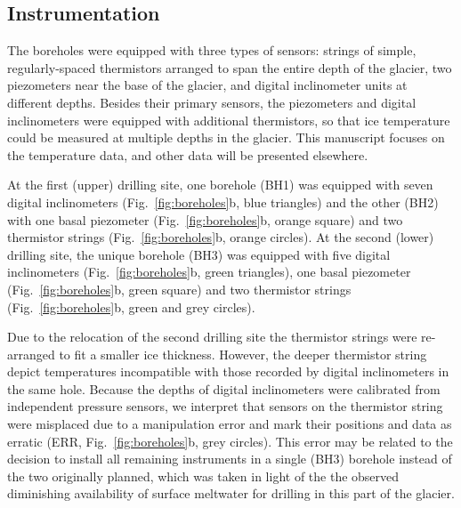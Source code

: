 \documentclass[utf8]{article}
\begin{document}
\subsection{Instrumentation}

    The boreholes were equipped with three types of sensors: strings of simple,
    regularly-spaced thermistors arranged to span the entire depth of the
    glacier, two piezometers near the base of the glacier, and digital
    inclinometer units at different depths. Besides their primary sensors, the
    piezometers and digital inclinometers were equipped with additional
    thermistors, so that ice temperature could be measured at multiple depths
    in the glacier. This manuscript focuses on the temperature data, and other
    data will be presented elsewhere.

    At the first (upper) drilling site, one borehole (BH1) was equipped with
    seven digital inclinometers (Fig.~\ref{fig:boreholes}b, blue triangles) and
    the other (BH2) with one basal piezometer (Fig.~\ref{fig:boreholes}b,
    orange square) and two thermistor strings (Fig.~\ref{fig:boreholes}b,
    orange circles). At the second (lower) drilling site, the unique
    borehole (BH3) was equipped with five digital inclinometers
    (Fig.~\ref{fig:boreholes}b, green triangles), one basal piezometer
    (Fig.~\ref{fig:boreholes}b, green square) and two thermistor strings
    (Fig.~\ref{fig:boreholes}b, green and grey circles).

    Due to the relocation of the second drilling site the thermistor strings
    were re-arranged to fit a smaller ice thickness. However, the deeper
    thermistor string depict temperatures incompatible with those recorded by
    digital inclinometers in the same hole. Because the depths of digital
    inclinometers were calibrated from independent pressure sensors, we
    interpret that sensors on the thermistor string were misplaced due to a
    manipulation error and mark their positions and data as erratic (ERR,
    Fig.~\ref{fig:boreholes}b, grey circles). This error may be related to the
    decision to install all remaining instruments in a single (BH3) borehole
    instead of the two originally planned, which was taken in light of the
    the observed diminishing availability of surface meltwater for drilling in
    this part of the glacier.
\end{document}
